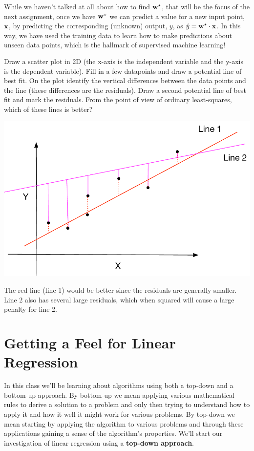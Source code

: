 \documentclass[assignment01_Solutions]{subfiles}
\begin{document}
While we haven't talked at all about how to find $\mathbf{w}^\star$, that will be the focus of the next assignment, once we have $\mathbf{w}^\star$ we can predict a value for a new input point, $\mathbf{x}$, by predicting the corresponding (unknown) output, $y$, as $\hat{y} = \mathbf{w^\star} \cdot \mathbf{x}$.  In this way, we have used the training data to learn how to make predictions about unseen data points, which is the hallmark of supervised machine learning!

\begin{exercise}
Draw a scatter plot in 2D (the x-axis is the independent variable and the y-axis is the dependent variable).  Fill in a few datapoints and draw a potential line of best fit.  On the plot identify the vertical differences between the data points and the line (these differences are the residuals).  Draw a second potential line of best fit and mark the residuals.  From the point of view of ordinary least-squares, which of these lines is better?

\begin{boxedsolution}
\begin{center}
\includegraphics[width=0.8\linewidth]{figures/exercise3solution}
\end{center}

The red line (line 1) would be better since the residuals are generally smaller.  Line 2 also has several large residuals, which when squared will cause a large penalty for line 2.
\end{boxedsolution}
\end{exercise}

\section{Getting a Feel for Linear Regression}
In this class we'll be learning about algorithms using both a top-down and a bottom-up approach.  By bottom-up we mean applying various mathematical rules to derive a solution to a problem and only then trying to understand how to apply it and how it well it might work for various problems.  By top-down we mean starting by applying the algorithm to various problems and through these applications gaining a sense of the algorithm's properties.  We'll start our investigation of linear regression using a \textbf{top-down approach}.
\end{document}
